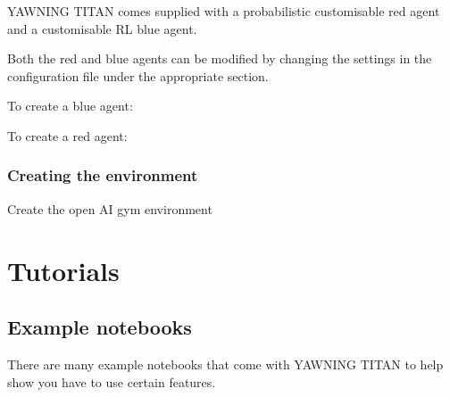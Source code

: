 \documentclass[letterpaper,10pt,english]{sphinxmanual}
\begin{document}
\sphinxAtStartPar
YAWNING TITAN comes supplied with a probabilistic customisable red agent and a
customisable RL blue agent.

\sphinxAtStartPar
Both the red and blue agents can be modified by changing the settings in the configuration
file under the appropriate section.

\sphinxAtStartPar
To create a blue agent:

\begin{sphinxVerbatim}[commandchars=\\\{\}]
  
\end{sphinxVerbatim}

\sphinxAtStartPar
To create a red agent:

\begin{sphinxVerbatim}[commandchars=\\\{\}]
  
\end{sphinxVerbatim}


\subsection{Creating the environment}
\label{\detokenize{source/getting_started:creating-the-environment}}
\sphinxAtStartPar
Create the open AI gym environment

\begin{sphinxVerbatim}[commandchars=\\\{\}]
  

     
\end{sphinxVerbatim}


\chapter{Tutorials}
\label{\detokenize{source/tutorials:tutorials}}\label{\detokenize{source/tutorials::doc}}

\section{Example notebooks}
\label{\detokenize{source/tutorials:example-notebooks}}
\sphinxAtStartPar
There are many example notebooks that come with YAWNING TITAN to help show you have to
use certain features.
\end{document}
